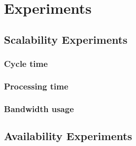 
\chapter{Experiments}

\section{Scalability Experiments}

\subsection{Cycle time}

\subsection{Processing time}

\subsection{Bandwidth usage}

\section{Availability Experiments}